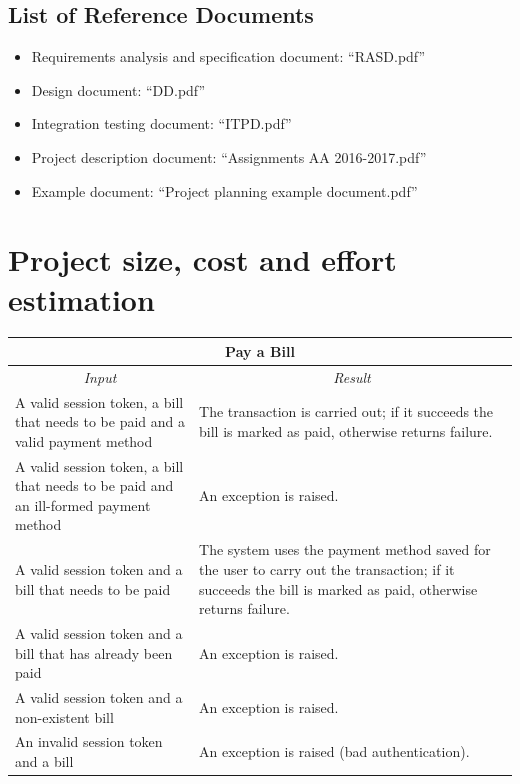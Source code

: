 \documentclass[english]{article}
\begin{document}

\subsection{List of Reference Documents}

\begin{itemize}
	\item{Requirements analysis and specification document: “RASD.pdf”}
	\item{Design document: “DD.pdf”}
	\item{Integration testing document: “ITPD.pdf”}
	\item{Project description document: “Assignments AA 2016-2017.pdf”}
	\item{Example document: “Project planning example document.pdf”}
\end{itemize}

\section{Project size, cost and effort estimation}


\begin{center}
	\begin{tabular}{ | p{6cm} | p{6cm} | }
		\hline 
		\multicolumn{2}{|c|}{\textbf{Pay a Bill}} \\
		\hline
		\multicolumn{1}{|c|}{\textit{Input}} & \multicolumn{1}{c|}{\textit{Result}} \\
		\hline
		A valid session token, a bill that needs to be paid and a valid payment method &  The transaction is carried out; if it succeeds the bill is marked as paid, otherwise returns failure. \\
		\hline
		A valid session token, a bill that needs to be paid and an ill-formed payment method & An exception is raised. \\
		\hline
		A valid session token and a bill that needs to be paid & The system uses the payment method saved for the user to carry out the transaction; if it succeeds the bill is marked as paid, otherwise returns failure. \\
		\hline
		A valid session token and a bill that has already been paid & An exception is raised. \\
		\hline
		A valid session token and a non-existent bill & An exception is raised. \\
		\hline
		An invalid session token and a bill & An exception is raised (bad authentication). \\
		\hline
	\end{tabular}
\end{center}
\end{document}
